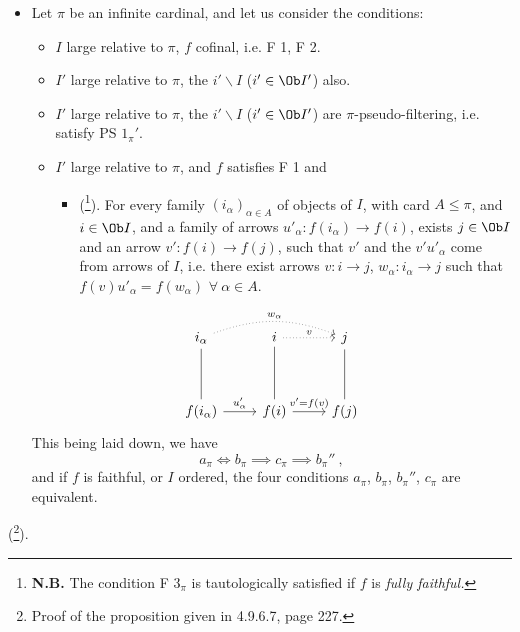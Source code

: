 {\itshape
\begin{itemize}[label={}]
\item[2)] Let $\pi$ be an infinite cardinal, and let us consider the conditions:
\begin{itemize}[label={}]
\item[$a_\pi$)] $I$ large relative to $\pi$, $f$ cofinal, i.e. F 1, F 2.
\item[$b_\pi$)] $I'$ large relative to $\pi$, the $i'\backslash I$ ($i' \in \Ob I'$) also.
\item[$b_\pi{}''$)] $I'$ large relative to $\pi$, the $i'\backslash I$ ($i' \in \Ob I'$) are $\pi$-pseudo-filtering, i.e. satisfy PS $1_\pi{}'$. %
\item[$c_\pi$)] $I'$ large relative to $\pi$, and $f$ satisfies F 1 and
\begin{itemize}[label={}]
\item[\rbox{F $3_\pi$}] \textup{(}\footnote[101]{\textbf{N.B.} The condition F $3_\pi$ is tautologically satisfied if $f$ is \textit{fully faithful.}}\textup{)}. For every family $(i_\alpha)_{\alpha \in A}$ of objects of $I$, with \textup{card} $A \leqslant \pi$, and $i \in \Ob I$, and a family of arrows $u'_\alpha : f(i_\alpha) \longrightarrow f(i)$, exists $j \in \Ob I$ and an arrow $v' : f(i) \longrightarrow f(j)$, such that $v'$ \textup{and} the $v'u'_\alpha$ come from arrows of $I$, i.e. there exist arrows $v : i \longrightarrow j$, $w_\alpha : i_\alpha \longrightarrow j$ such that $f(v)u'_\alpha = f(w_\alpha)$ $\forall\ \alpha \in A$.
\end{itemize}
\end{itemize}
\[
\begin{tikzcd}[row sep=huge]
i_\alpha \arrow[d, dash] \arrow[rr, dotted, bend left=20, "w_\alpha"] & i \arrow[r, dotted, "v"] \arrow[d, dash] & j \arrow[d, dash] \\
f(i_\alpha) \arrow[r, "u'_\alpha"] & f(i) \arrow[r, "v' = f(v)"] & f(j)
\end{tikzcd}
\]
This being laid down, we have
\[
a_\pi \iff b_\pi \implies c_\pi \implies b_\pi{}'' \ ,
\]
and if $f$ is faithful, or $I$ ordered, the four conditions $a_\pi$, $b_\pi$, $b_\pi{}''$, $c_\pi$ are equivalent.
\end{itemize}
}
(\footnote[102]{Proof of the proposition given in 4.9.6.7, page 227.}).

